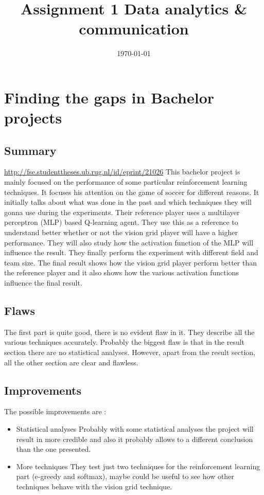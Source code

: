 \documentclass[11pt]{article}
\date{\today}
\title{Assignment 1 Data analytics \& communication}
\begin{document}
\maketitle
\tableofcontents


\section{Finding the gaps in Bachelor projects}
\label{sec:org6d1316f}
\subsection{Summary}
\label{sec:org79b5639}
\url{http://fse.studenttheses.ub.rug.nl/id/eprint/21026}
This bachelor project is mainly focused on the performance of some particular reinforcement learning techniques.
It focuses his attention on the game of soccer for different reasons. It initially talks about what was done in the past
and which techniques they will gonna use during the experiments.
Their reference player uses a multilayer perceptron  (MLP) based Q-learning agent. They use this as a reference to understand better whether or not the vision grid player will have a higher performance. They will also study how
the activation function of the MLP will influence the result.
They finally perform the experiment with different field and team size. The final result shows how the vision grid
player perform better than the reference player and it also shows how the various activation functions influence the final
result.

\subsection{Flaws}
\label{sec:orgda944fa}
The first part is quite good, there is no evident flaw in it. They describe all the various techniques accurately.
Probably the biggest flaw is that in the result section there are no statistical analyses.
However, apart from the result section, all the other section are clear and flawless.
\subsection{Improvements}
\label{sec:org0922caa}
The possible improvements are :
\begin{itemize}
\item Statistical analyses
  Probably with some statistical analyses the project will result in more credible and also it probably allows to a different conclusion than the one presented.
\item More techniques
  They test just two techniques for the reinforcement learning part (e-greedy and softmax),
  maybe could be useful to see how other techniques behave with the vision grid technique.
\end{itemize}
\end{document}
